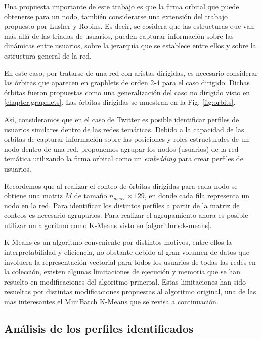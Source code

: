 Una propuesta importante de este trabajo es que la firma orbital que puede obtenerse para un nodo, también considerarse una extensión del trabajo propuesto por Lusher y Robins. Es decir, se cosidera que las estructuras que van más allá de las triadas de usuarios, pueden capturar información sobre las dinámicas entre usuarios, sobre la jerarquía que se establece entre ellos y sobre la estructura general de la red. 

En este caso, por tratarse de una red con aristas dirigidas, es necesario considerar las órbitas que aparecen en graphlets de orden 2-4 para el caso dirigido. Dichas órbitas fueron propuestas como una generalización del caso no dirigido visto en \ref{chapter:graphlets}. Las órbitas dirigidas se muestran en la Fig. \ref{fig:orbits}. 

Así, consideramos que en el caso de Twitter es posible identificar perfiles de usuarios similares dentro de las redes temáticas. Debido a la capacidad de las orbitas de capturar información sobre las posiciones y roles estructurales de un nodo dentro de una red, proponemos agrupar los nodos (usuarios) de la red temática utilizando la firma orbital como un \textit{embedding} para crear perfiles de usuarios.

Recordemos que al realizar el conteo de órbitas dirigidas para cada nodo se obtiene una matriz $M$ de tamaño $n_{users}\times 129$, en donde cada fila representa un nodo en la red. Para identificar los distintos perfiles a partir de la matriz de conteos es necesario agruparlos. Para realizar el agrupamiento ahora es posible utilizar un algoritmo como K-Means visto en \ref{algorithms:k-means}.


K-Means es un algoritmo conveniente por distintos motivos, entre ellos la interpretabilidad y eficiencia, no obstante debido al gran volumen de datos que involucra la representación vectorial para todos los usuarios de todas las redes en la colección, existen algunas limitaciones de ejecución y memoria que se han resuelto en modificaciones del algoritmo principal. Estas limitaciones han sido resueltas por distintas modificaciones propuestas al algoritmo original, una de las mas interesantes el MiniBatch K-Means que se revisa a continuación.

\subsection{Análisis de los perfiles identificados}

